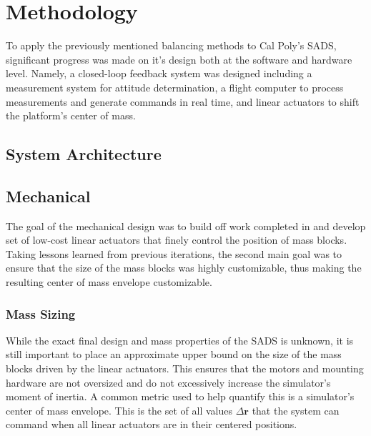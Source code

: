 \chapter{Methodology}

To apply the previously mentioned balancing methods to Cal Poly's SADS, significant progress was made on it's design both at the software and hardware level. Namely, a closed-loop feedback system was designed including a measurement system for attitude determination, a flight computer to process measurements and generate commands in real time, and linear actuators to shift the platform's center of mass.

\section{System Architecture}

\section{Mechanical}

The goal of the mechanical design was to build off work completed in \cite{gilman_automatic_2024} and develop set of low-cost linear actuators that finely control the position of mass blocks. Taking lessons learned from previous iterations, the second main goal was to ensure that the size of the mass blocks was highly customizable, thus making the resulting center of mass envelope customizable. 

\subsection{Mass Sizing}

While the exact final design and mass properties of the SADS is unknown, it is still important to place an approximate upper bound on the size of the mass blocks driven by the linear actuators. This ensures that the motors and mounting hardware are not oversized and do not excessively increase the simulator's moment of inertia. A common metric used to help quantify this is a simulator's center of mass envelope. This is the set of all values $\Delta\mathbf{r}$ that the system can command when all linear actuators are in their centered positions.

